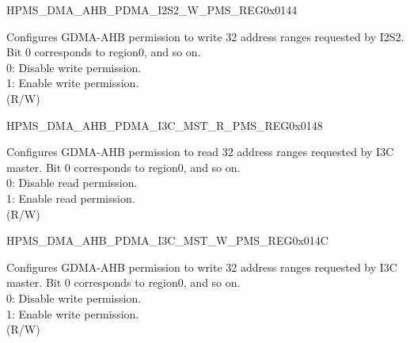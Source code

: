 \begin{register}{H}{PMS\_DMA\_AHB\_PDMA\_I2S2\_W\_PMS\_REG}{0x0144}\label{regdesc:PMSDMAAHBPDMAI2S2WPMSREG}
%
\regnewline%
\begin{regdesc}\begin{reglist}
\label{fielddesc:PMSDMAAHBPDMAI2S2WPMS}\item [PMS\_DMA\_AHB\_PDMA\_I2S2\_W\_PMS] Configures GDMA-AHB permission to write 32 address ranges requested by I2S2. Bit 0 corresponds to region0, and so on.\\
0: Disable write permission.\\
1: Enable write permission.\\ (R/W)
\end{reglist}\end{regdesc}
\end{register}


\begin{register}{H}{PMS\_DMA\_AHB\_PDMA\_I3C\_MST\_R\_PMS\_REG}{0x0148}\label{regdesc:PMSDMAAHBPDMAI3CMSTRPMSREG}
%
\regnewline%
\begin{regdesc}\begin{reglist}
\label{fielddesc:PMSDMAAHBPDMAI3CMSTRPMS}\item [PMS\_DMA\_AHB\_PDMA\_I3C\_MST\_R\_PMS] Configures GDMA-AHB permission to read 32 address ranges requested by I3C  master. Bit 0 corresponds to region0, and so on.\\
0: Disable read permission.\\
1: Enable read permission.\\ (R/W)
\end{reglist}\end{regdesc}
\end{register}


\begin{register}{H}{PMS\_DMA\_AHB\_PDMA\_I3C\_MST\_W\_PMS\_REG}{0x014C}\label{regdesc:PMSDMAAHBPDMAI3CMSTWPMSREG}
%
\regnewline%
\begin{regdesc}\begin{reglist}
\label{fielddesc:PMSDMAAHBPDMAI3CMSTWPMS}\item [PMS\_DMA\_AHB\_PDMA\_I3C\_MST\_W\_PMS] Configures GDMA-AHB permission to write 32 address ranges requested by I3C  master. Bit 0 corresponds to region0, and so on.\\
0: Disable write permission.\\
1: Enable write permission.\\ (R/W)
\end{reglist}\end{regdesc}
\end{register}


